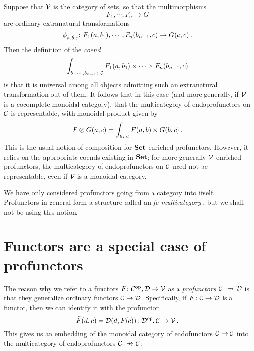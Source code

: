 Suppose that ${\mathcal{V}}$ is the category of sets, so that the multimorphisms
\[
  F_1,\cdots,F_n \to G
  \]
are ordinary extranatural transformations
\[
  \phi_{a,\vec{b},c} \colon F_1(a,b_1),\cdots,F_n(b_{n-1},c) \to G(a,c)\,.
  \]
Then the definition of the \emph{coend}
\[
  \int_{b_1,\cdots,b_{n-1}\colon{\mathcal{C}}} F_1(a,b_1)\times\cdots\times F_n(b_{n-1},c)
  \]
is that it is universal among all objects admitting such an extranatural transformation out of them.  
It follows that in this case (and more generally, if ${\mathcal{V}}$ is a cocomplete monoidal category), that the multicategory of endoprofunctors on ${\mathcal{C}}$ is representable, with monoidal product given by
\[
  F\otimes G(a, c) = \int_{b\colon {\mathcal{C}}} F(a,b) \times G(b,c)\,.
  \]
This is the usual notion of composition for ${\normalfont\textbf{Set}}$-enriched profunctors.  
However, it relies on the appropriate coends existing in ${\normalfont\textbf{Set}}$; for more generally ${\mathcal{V}}$-enriched profunctors, the multicategory of endoprofunctors on ${\mathcal{C}}$ need not be representable, even if ${\mathcal{V}}$ is a monoidal category.

We have only considered profunctors going from a category into itself.  
Profunctors in general form a structure called an \emph{fc-multicategory} \cite{Multicategories}, but we shall not be using this notion.

\section{Functors are a special case of profunctors}

The reason why we refer to a functors $F\colon {\mathcal{C}}^{\mathrm{op}},{\mathcal{D}} \to {\mathcal{V}}$ as a \emph{profunctors} $\C \pto \D$ is that they generalize ordinary functors ${\mathcal{C}} \to {\mathcal{D}}$.  
Specifically, if $F \colon {\mathcal{C}} \to {\mathcal{D}}$ is a functor, then we can identify it with the profunctor
\[
  \tilde{F}(d,c) = {\mathcal{D}}(d, F(c)) \colon {\mathcal{D}}^{\mathrm{op}}, {\mathcal{C}} \to {\mathcal{V}}\,.
  \]
This gives us an embedding of the monoidal category of endofunctors ${\mathcal{C}} \to {\mathcal{C}}$ into the multicategory of endoprofunctors $\C \pto \C$:

